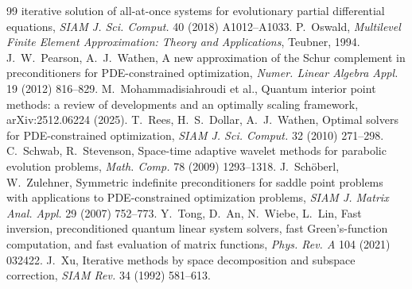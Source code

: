 \documentclass[11pt,a4paper]{article}
\theoremstyle{remark}
\begin{document}
\begin{thebibliography}{99}
  iterative solution of all-at-once systems for evolutionary partial
  differential equations, \emph{SIAM J. Sci. Comput.} 40 (2018)
  A1012--A1033.
 P.~Oswald, \emph{Multilevel Finite Element Approximation:
  Theory and Applications}, Teubner, 1994.
 J.~W.~Pearson, A.~J.~Wathen, A new approximation of the Schur
  complement in preconditioners for PDE-constrained optimization,
  \emph{Numer. Linear Algebra Appl.} 19 (2012) 816--829.
 M.~Mohammadisiahroudi et al., Quantum interior point
  methods: a review of developments and an optimally scaling framework,
  arXiv:2512.06224 (2025).
 T.~Rees, H.~S.~Dollar, A.~J.~Wathen, Optimal solvers for
  PDE-constrained optimization, \emph{SIAM J. Sci. Comput.} 32 (2010)
  271--298.
 C.~Schwab, R.~Stevenson, Space-time adaptive wavelet methods for
  parabolic evolution problems, \emph{Math. Comp.} 78 (2009) 1293--1318.
 J.~Sch\"oberl, W.~Zulehner, Symmetric indefinite preconditioners
  for saddle point problems with applications to PDE-constrained
  optimization problems, \emph{SIAM J. Matrix Anal. Appl.} 29 (2007)
  752--773.
 Y.~Tong, D.~An, N.~Wiebe, L.~Lin, Fast inversion, preconditioned
  quantum linear system solvers, fast Green's-function computation, and
  fast evaluation of matrix functions, \emph{Phys. Rev. A} 104 (2021)
  032422.
 J.~Xu, Iterative methods by space decomposition and subspace
  correction, \emph{SIAM Rev.} 34 (1992) 581--613.
\end{thebibliography}
\end{document}
